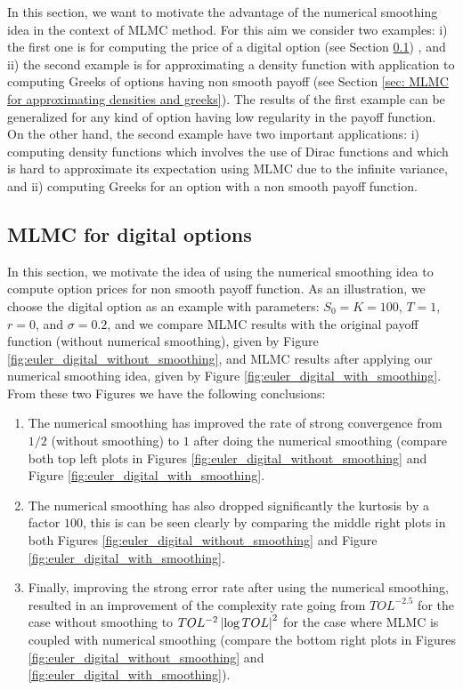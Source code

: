 In this section, we want to motivate the advantage of the numerical smoothing idea in the context of MLMC method. For this aim we consider two examples: i) the first one is for computing the price of a digital option (see Section \ref{sec: MLMC for digital options}) , and ii) the second example is for approximating a density function with application to computing Greeks of options having non smooth payoff (see Section \ref{sec: MLMC for approximating densities and greeks}). The results  of the first example can be generalized for any kind of option having low regularity in the payoff function. On the other hand, the second example have two important applications: i) computing density functions which involves the use of Dirac functions and which is hard to approximate its expectation using MLMC due to the infinite variance, and ii) computing Greeks for an option with a non smooth payoff function.


\subsection{MLMC for digital options}\label{sec: MLMC for digital options}
In this section, we motivate the idea of using the numerical smoothing idea to compute option prices for non smooth payoff function. As an illustration, we choose the digital option as an example with parameters: $S_0=K=100$, $T=1$, $r= 0$, and   $\sigma=0.2$, and we compare MLMC results with the original payoff function (without numerical smoothing), given by Figure \ref{fig:euler_digital_without_smoothing},  and MLMC results after applying our numerical smoothing idea, given by Figure \ref{fig:euler_digital_with_smoothing}. From these two Figures we have the following conclusions:
\begin{enumerate}
\item The numerical smoothing has improved the rate of strong convergence from $1/2$ (without smoothing) to $1$ after doing the numerical smoothing (compare both top left plots in Figures \ref{fig:euler_digital_without_smoothing} and Figure \ref{fig:euler_digital_with_smoothing}.
\item The numerical smoothing has also dropped significantly the kurtosis by a factor $100$, this is can be seen clearly by comparing the middle right plots in both Figures \ref{fig:euler_digital_without_smoothing} and Figure \ref{fig:euler_digital_with_smoothing}.
\item Finally, improving the strong error rate after using the numerical smoothing, resulted in an improvement of the complexity rate going from $TOL^{-2.5}$ for the case without smoothing to  $TOL^{-2} \left\lvert\log TOL\right\rvert^2$ for the case where MLMC is coupled with numerical smoothing (compare the bottom right plots in Figures \ref{fig:euler_digital_without_smoothing} and \ref{fig:euler_digital_with_smoothing}).
\end{enumerate}

